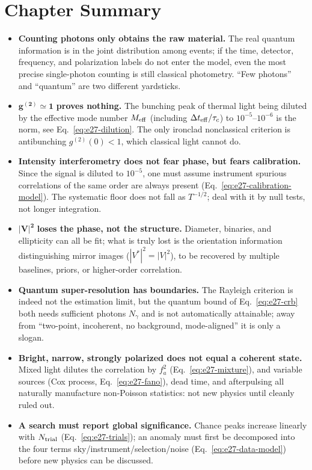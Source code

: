 \section{Chapter Summary}
\label{sec:e27-summary}

\begin{itemize}
  \item \textbf{Counting photons only obtains the raw material.} The real quantum information is in the joint distribution among events; if the time, detector, frequency, and polarization labels do not enter the model, even the most precise single-photon counting is still classical photometry. ``Few photons'' and ``quantum'' are two different yardsticks.
  \item \(\mathbf{g^{(2)}\simeq1}\)\textbf{ proves nothing.} The bunching peak of thermal light being diluted by the effective mode number \(M_{\rm eff}\) (including \(\Delta t_{\rm eff}/\tau_c\)) to \(10^{-5}\)--\(10^{-6}\) is the norm, see Eq.\ \eqref{eq:e27-dilution}. The only ironclad nonclassical criterion is antibunching \(g^{(2)}(0)<1\), which classical light cannot do.
  \item \textbf{Intensity interferometry does not fear phase, but fears calibration.} Since the signal is diluted to \(10^{-5}\), one must assume instrument spurious correlations of the same order are always present (Eq.\ \eqref{eq:e27-calibration-model}). The systematic floor does not fall as \(T^{-1/2}\); deal with it by null tests, not longer integration.
  \item \(\mathbf{|V|^2}\)\textbf{ loses the phase, not the structure.} Diameter, binaries, and ellipticity can all be fit; what is truly lost is the orientation information distinguishing mirror images (\(|V^\ast|^2=|V|^2\)), to be recovered by multiple baselines, priors, or higher-order correlation.
  \item \textbf{Quantum super-resolution has boundaries.} The Rayleigh criterion is indeed not the estimation limit, but the quantum bound of Eq.\ \eqref{eq:e27-crb} both needs sufficient photons \(N_\gamma\) and is not automatically attainable; away from ``two-point, incoherent, no background, mode-aligned'' it is only a slogan.
  \item \textbf{Bright, narrow, strongly polarized does not equal a coherent state.} Mixed light dilutes the correlation by \(f_a^2\) (Eq.\ \eqref{eq:e27-mixture}), and variable sources (Cox process, Eq.\ \eqref{eq:e27-fano}), dead time, and afterpulsing all naturally manufacture non-Poisson statistics: not new physics until cleanly ruled out.
  \item \textbf{A search must report global significance.} Chance peaks increase linearly with \(N_{\rm trial}\) (Eq.\ \eqref{eq:e27-trials}); an anomaly must first be decomposed into the four terms sky/instrument/selection/noise (Eq.\ \eqref{eq:e27-data-model}) before new physics can be discussed.
\end{itemize}


